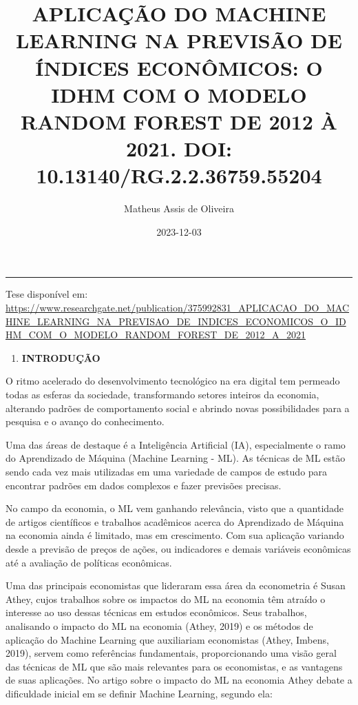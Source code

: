 \documentclass[
]{article}
\title{APLICAÇÃO DO MACHINE LEARNING NA PREVISÃO DE ÍNDICES ECONÔMICOS:
O IDHM COM O MODELO RANDOM FOREST DE 2012 À 2021. DOI:
10.13140/RG.2.2.36759.55204}
\author{Matheus Assis de Oliveira}
\date{2023-12-03}
\providecommand{\tightlist}{%
  \setlength{\itemsep}{0pt}\setlength{\parskip}{0pt}}
\begin{document}
\maketitle

\begin{center}\rule{0.5\linewidth}{0.5pt}\end{center}

Tese disponível em:
\url{https://www.researchgate.net/publication/375992831_APLICACAO_DO_MACHINE_LEARNING_NA_PREVISAO_DE_INDICES_ECONOMICOS_O_IDHM_COM_O_MODELO_RANDOM_FOREST_DE_2012_A_2021}

\begin{enumerate}
\def\labelenumi{\arabic{enumi}.}
\tightlist
\item
  \textbf{INTRODUÇÃO}
\end{enumerate}

O ritmo acelerado do desenvolvimento tecnológico na era digital tem
permeado todas as esferas da sociedade, transformando setores inteiros
da economia, alterando padrões de comportamento social e abrindo novas
possibilidades para a pesquisa e o avanço do conhecimento.

Uma das áreas de destaque é a Inteligência Artificial (IA),
especialmente o ramo do Aprendizado de Máquina (Machine Learning - ML).
As técnicas de ML estão sendo cada vez mais utilizadas em uma variedade
de campos de estudo para encontrar padrões em dados complexos e fazer
previsões precisas.

No campo da economia, o ML vem ganhando relevância, visto que a
quantidade de artigos científicos e trabalhos acadêmicos acerca do
Aprendizado de Máquina na economia ainda é limitado, mas em crescimento.
Com sua aplicação variando desde a previsão de preços de ações, ou
indicadores e demais variáveis econômicas até a avaliação de políticas
econômicas.

Uma das principais economistas que lideraram essa área da econometria é
Susan Athey, cujos trabalhos sobre os impactos do ML na economia têm
atraído o interesse ao uso dessas técnicas em estudos econômicos. Seus
trabalhos, analisando o impacto do ML na economia (Athey, 2019) e os
métodos de aplicação do Machine Learning que auxiliariam economistas
(Athey, Imbens, 2019), servem como referências fundamentais,
proporcionando uma visão geral das técnicas de ML que são mais
relevantes para os economistas, e as vantagens de suas aplicações. No
artigo sobre o impacto do ML na economia Athey debate a dificuldade
inicial em se definir Machine Learning, segundo ela:
\end{document}
